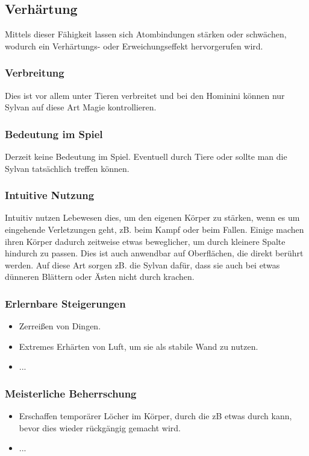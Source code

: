 \subsection{Verhärtung}\label{sec:haertungsmagie}
Mittels dieser Fähigkeit lassen sich Atombindungen stärken oder schwächen, wodurch ein Verhärtungs- oder Erweichungseffekt hervorgerufen wird.

\subsubsection{Verbreitung}
Dies ist vor allem unter Tieren verbreitet und bei den Hominini können nur Sylvan auf diese Art Magie kontrollieren.

\subsubsection{Bedeutung im Spiel}
Derzeit keine Bedeutung im Spiel. Eventuell durch Tiere oder sollte man die Sylvan tatsächlich treffen können.

\subsubsection{Intuitive Nutzung}
Intuitiv nutzen Lebewesen dies, um den eigenen Körper zu stärken, wenn es um eingehende Verletzungen geht, zB. beim Kampf oder beim Fallen. Einige machen ihren Körper dadurch zeitweise etwas beweglicher, um durch kleinere Spalte hindurch zu passen. Dies ist auch anwendbar auf Oberflächen, die direkt berührt werden. Auf diese Art sorgen zB. die Sylvan dafür, dass sie auch bei etwas dünneren Blättern oder Ästen nicht durch krachen.

\subsubsection{Erlernbare Steigerungen}
\begin{itemize}
	\item Zerreißen von Dingen.
	\item Extremes Erhärten von Luft, um sie als stabile Wand zu nutzen.
	\item ...
\end{itemize}

\subsubsection{Meisterliche Beherrschung} 
\begin{itemize}
	\item Erschaffen temporärer Löcher im Körper, durch die zB etwas durch kann, bevor dies wieder rückgängig gemacht wird.
	\item ...
\end{itemize}



